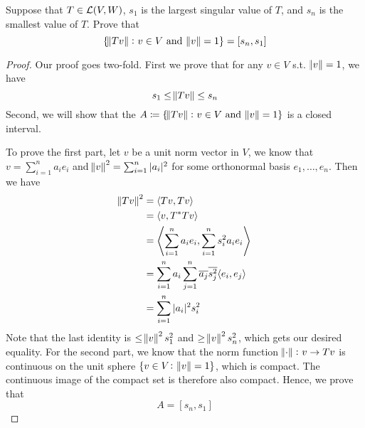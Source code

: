 \documentclass{extarticle}
\begin{document}
\begin{problem}{4}
    Suppose that \(T \in \mathcal{L}(V, W)\), \(s_1\) is the largest singular value of \(T\), and 
    \(s_n\) is the smallest value of \(T\). Prove that 
    \[\{\norm{Tv} \colon v \in V \text{ and } \norm{v} = 1\} = [s_n, s_1]\]
\end{problem}

\begin{proof}
Our proof goes two-fold. First we prove that for any \(v \in V\) s.t. \(\norm{v} = 1\), we have 
\[s_1 \leq \norm{Tv} \leq s_n\]
Second, we will show that the \(A \coloneqq \{\norm{Tv} \colon v \in V \text{ and } \norm{v} = 1\} \) 
is a closed interval. 

To prove the first part, let \(v\) be a unit norm vector in \(V\), we know that 
\(v = \sum_{i=1}^{n}a_i e_i\) and \(\norm{v}^2 = \sum_{i=1}^{n} |a_i|^2\) for some orthonormal 
basis \(e_1, \ldots, e_n\). Then we have 
\begin{align*}
    \norm{Tv}^2 
    &= \langle Tv,Tv \rangle \\ 
    &= \langle v,T^*Tv \rangle \\ 
    &= \left\langle \sum_{i=1}^{n} a_i e_i, \sum_{i=1}^{n} s_i^2a_ie_i \right\rangle \\ 
    &= \sum_{i=1}^{n} a_i \sum_{j=1}^{n} \overline{a_j} \overline{s_j^2} \langle e_i,e_j \rangle \\ 
    &= \sum_{i=1}^{n} |a_i|^2 s_i^2 \\ 
\end{align*}
Note that the last identity is \(\leq \norm{v}^2 s_1^2\) and \(\geq \norm{v}^2 s_n^2\), which gets 
our desired equality. For the second part, we know that the norm function \(\norm{\cdot} \colon 
v \to Tv\) is continuous on the unit sphere \(\{v \in V \colon \norm{v}  =1\}\), which is compact. The 
continuous image of the compact set is therefore also compact. Hence, we prove that 
\[A = [s_n, s_1]\]
\end{proof}
\end{document}
